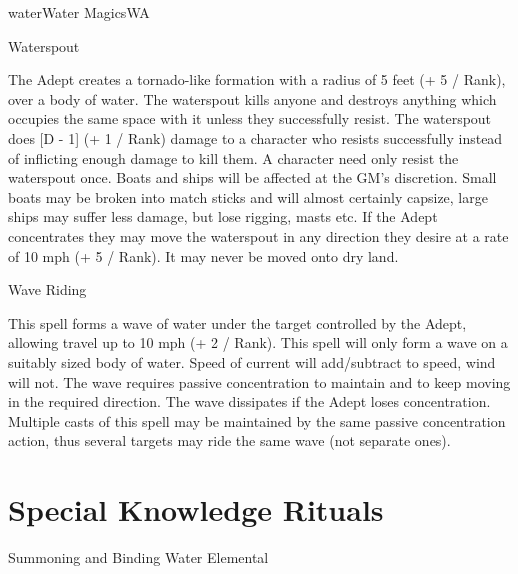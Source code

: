 \begin{College}[1.3]{water}{Water Magics}{WA}
\begin{spell}[S-14]{Waterspout}
\begin{effects}
The Adept creates a tornado-like formation with a radius of 5 feet (+
5 / Rank), over a body of water.  The waterspout kills anyone and
destroys anything which occupies the same space with it unless they
successfully resist.  The waterspout does [D - 1] (+ 1 / Rank) damage
to a character who resists successfully instead of inflicting enough
damage to kill them. A character need only resist the waterspout
once. Boats and ships will be affected at the GM’s discretion.  Small
boats may be broken into match sticks and will almost certainly
capsize, large ships may suffer less damage, but lose rigging, masts
etc.  If the Adept concentrates they may move the waterspout in any
direction they desire at a rate of 10 mph (+ 5 / Rank). It may never
be moved onto dry land.
\end{effects}
\end{spell}

\begin{spell}[S-15]{Wave Riding}

\begin{effects}
This spell forms a wave of water under the target controlled by the
Adept, allowing travel up to 10 mph (+ 2 / Rank). This spell will only
form a wave on a suitably sized body of water.  Speed of current will
add/subtract to speed, wind will not.  The wave requires passive
concentration to maintain and to keep moving in the required
direction.  The wave dissipates if the Adept loses concentration.
Multiple casts of this spell may be maintained by the same passive
concentration action, thus several targets may ride the same wave (not
separate ones).
\end{effects}
\end{spell}


\section{Special Knowledge Rituals}

\begin{ritual}[R-1]{Summoning and Binding Water Elemental}


\end{ritual}
\end{College}
